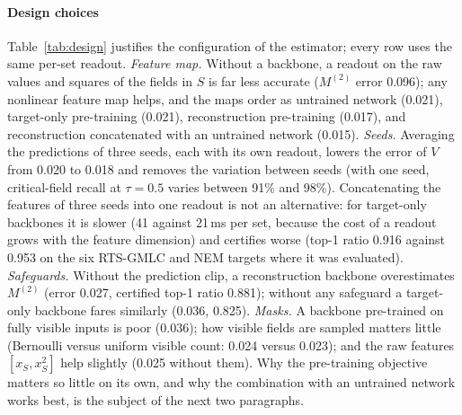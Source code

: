 

\paragraph{Design choices}
Table~\ref{tab:design} justifies the configuration of the estimator; every row uses the same per-set readout.
\emph{Feature map.} Without a backbone, a readout on the raw values and squares of the fields in $S$ is far less accurate
($M^{(2)}$ error 0.096); any nonlinear feature map helps, and the maps order as untrained network (0.021), target-only
pre-training (0.021), reconstruction pre-training (0.017), and reconstruction concatenated with an untrained network (0.015).
\emph{Seeds.} Averaging the predictions of three seeds, each with its own readout, lowers the error of $V$ from 0.020 to
0.018 and removes the variation between seeds (with one seed, critical-field recall at $\tau=0.5$ varies between 91\% and
98\%). Concatenating the features of three seeds into one readout is not an alternative: for target-only backbones it is
slower (41 against 21\,ms per set, because the cost of a readout grows with the feature dimension) and certifies worse
(top-1 ratio 0.916 against 0.953 on the six RTS-GMLC and NEM targets where it was evaluated). \emph{Safeguards.} Without
the prediction clip, a reconstruction backbone overestimates $M^{(2)}$ (error 0.027, certified top-1 ratio 0.881); without
any safeguard a target-only backbone fares similarly (0.036, 0.825). \emph{Masks.} A backbone pre-trained on fully visible
inputs is poor (0.036); how visible fields are sampled matters little (Bernoulli versus uniform visible count: 0.024 versus
0.023); and the raw features $[x_S, x_S^2]$ help slightly (0.025 without them). Why the pre-training objective matters so
little on its own, and why the combination with an untrained network works best, is the subject of the next two paragraphs.

